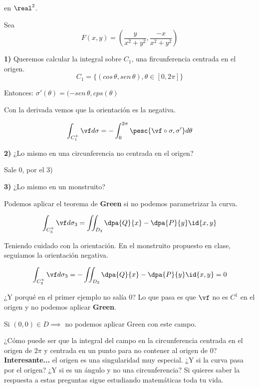 \begin{example}
en $\real^2$.

Sea \[F(x,y) = \left(\frac{y}{x^2+y^2}, \frac{-x}{x^2+y^2}\right)\]

\textbf{1)}
Queremos calcular la integral sobre $C_1$, una fircunferencia centrada en el origen.
\[C_1 = \{(cos\,\theta,sen\,\theta),\theta\in[0,2\pi]\}\]

Entonces: $\sigma'(\theta) = (-sen\,\theta,cps(\theta)$

Con la derivada vemos que la orientación es la negativa.

\[\int_{C_1^+} \vf d\sigma = -\int_0^{2\pi} \pesc{\vf\circ\sigma,\sigma'}d\theta\]

\textbf{2)}
¿Lo mismo en una circunferencia no centrada en el origen?

Sale $0$, por el 3)

\textbf{3)} 
¿Lo mismo en un monstruito?

Podemos aplicar el teorema de \textbf{Green} si no podemos parametrizar la curva.

\[\int_{C_3^+} \vf d\sigma_3 = \iint_{D_3} \dpa{Q}{x} - \dpa{P}{y} \id{x,y}\]

Teniendo cuidado con la orientación. En el monstruito propuesto en clase, seguíamos la orientación negativa.

\[\int_{C_3^+} \vf d\sigma_3 =  - \iint_{D_3} \dpa{Q}{x} - \dpa{P}{y} \id{x,y} = 0\]


\obs
¿Y porqué en el primer ejemplo no salía 0? Lo que pasa es que $\vf$ no es $C^1$ en el origen y no podemos aplicar \textbf{Green}.

Si $(0,0)\in D \implies $ no podemos aplicar Green con este campo.

¿Cómo puede ser que la integral del campo en la circunferencia centrada en el origen de $2\pi$ y centrada en un punto para no contener al origen de $0$?  \textbf{Interesante...} el origen es una singularidad muy especial. ¿Y si la curva pasa por el origen? ¿Y si es un ángulo y no una circunferencia? Si quieres saber la respuesta a estas preguntas sigue estudiando matemáticas toda tu vida.

\end{example}





